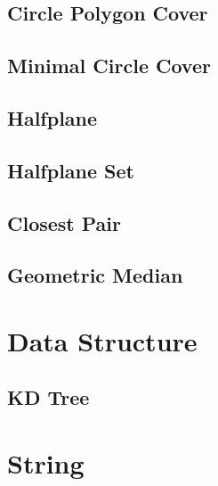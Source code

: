 \documentclass[10pt,twocolumn,oneside]{article}
\begin{document}
    \subsection{Circle Polygon Cover}
    
    \subsection{Minimal Circle Cover}
    
    \subsection{Halfplane}
    
    \subsection{Halfplane Set}
    
    \subsection{Closest Pair}
    
    \subsection{Geometric Median}
    

    \section{Data Structure}
    \subsection{KD Tree}
    
    \newpage

    \section{String}
\end{document}
